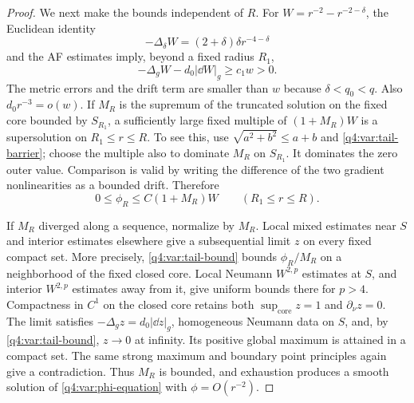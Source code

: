 \begin{proof}
We next make the bounds independent of $R$. For
$W=r^{-2}-r^{-2-\delta}$, the Euclidean identity
\[
 -\Delta_\delta W=(2+\delta)\delta r^{-4-\delta}
\]
and the AF estimates imply, beyond a fixed radius $R_1$,
\begin{equation}
 -\Delta_g W-d_0|\dd W|_g\ge c_1w>0.
\label{q4:var:tail-barrier}
\end{equation}
The metric errors and the drift term are smaller than $w$ because
$\delta<q_0<q$. Also $d_0r^{-3}=o(w)$.
If $M_R$ is the supremum of the truncated solution on the fixed core
bounded by $S_{R_1}$, a sufficiently large fixed multiple of
$(1+M_R)W$ is a supersolution on $R_1\le r\le R$. To see this, use
$\sqrt{a^2+b^2}\le a+b$ and \eqref{q4:var:tail-barrier}; choose the multiple
also to dominate $M_R$ on $S_{R_1}$. It dominates the zero outer value.
Comparison is valid by writing the difference of the two gradient
nonlinearities as a bounded drift. Therefore
\begin{equation}
 0\le\phi_R\le C(1+M_R)W\qquad (R_1\le r\le R).
\label{q4:var:tail-bound}
\end{equation}

If $M_R$ diverged along a sequence, normalize by $M_R$. Local mixed
estimates near $S$ and interior estimates elsewhere give a subsequential
limit $z$ on every fixed compact set. More precisely,
\eqref{q4:var:tail-bound} bounds $\phi_R/M_R$ on a neighborhood of the fixed
closed core. Local Neumann $W^{2,p}$ estimates at $S$, and interior
$W^{2,p}$ estimates away from it, give uniform bounds there for $p>4$.
Compactness in $C^1$ on the closed core retains both
$\sup_{\mathrm{core}}z=1$ and $\partial_\nu z=0$.
The limit satisfies
$-\Delta_gz=d_0|\dd z|_g$, homogeneous Neumann data on $S$, and,
by \eqref{q4:var:tail-bound}, $z\to0$ at infinity. Its positive global maximum
is attained in a compact set. The same strong maximum and boundary point
principles again give a contradiction. Thus $M_R$ is bounded, and
exhaustion produces a smooth solution of \eqref{q4:var:phi-equation} with
$\phi=O(r^{-2})$.


\end{proof}
